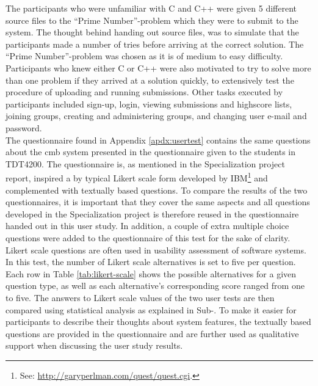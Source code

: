 The participants who were unfamiliar with C and C++ were given 5 different source files to the ``Prime Number''-problem which they were to submit to the system. The thought behind handing out source files, was to simulate that the participants made a number of tries before arriving at the correct solution. The ``Prime Number''-problem was chosen as it is of medium to easy difficulty. Participants who knew either C or C++ were also motivated to try to solve more than one problem if they arrived at a solution quickly, to extensively test the procedure of uploading and running submissions. Other tasks executed by participants included sign-up, login, viewing submissions and highscore lists, joining groups, creating and administering groups, and changing user e-mail and password. \\

The questionnaire found in Appendix \ref{apdx:usertest} contains the same questions about the \gls{cmb} system presented in the questionnaire given to the students in TDT4200. The questionnaire is, as mentioned in the Specialization project report, inspired a by typical Likert scale form developed by IBM\footnote{See: \url{http://garyperlman.com/quest/quest.cgi}.} and complemented with textually based questions. To compare the results of the two questionnaires, it is important that they cover the same aspects and all questions developed in the Specialization project is therefore reused in the questionnaire handed out in this user study. In addition, a couple of extra multiple choice questions were added to the questionnaire of this test for the sake of clarity. \\

Likert scale questions are often used in usability assessment of software systems. In this test, the number of Likert scale alternatives is set to five per question. Each row in Table \ref{tab:likert-scale} shows the possible alternatives for a given question type, as well as each alternative's corresponding score ranged from one to five. The answers to Likert scale values of the two user tests are then compared using statistical analysis as explained in Sub-. To make it easier for participants to describe their thoughts about system features, the textually based questions are provided in the questionnaire and are further used as qualitative support when discussing the user study results.

